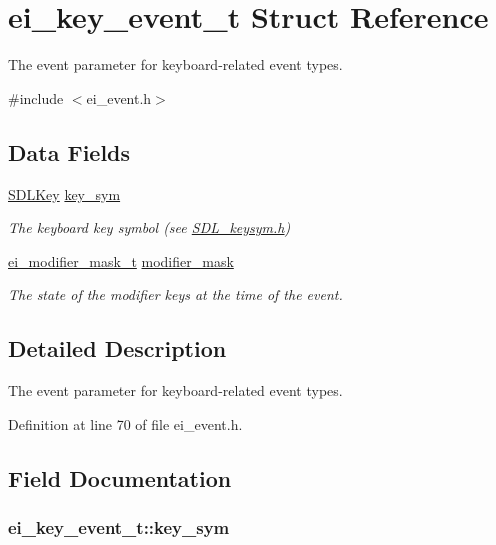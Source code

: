 \hypertarget{structei__key__event__t}{\section{ei\-\_\-key\-\_\-event\-\_\-t Struct Reference}
\label{structei__key__event__t}
}


The event parameter for keyboard-\/related event types.  




{\ttfamily \#include $<$ei\-\_\-event.\-h$>$}

\subsection*{Data Fields}
\begin{DoxyCompactItemize}
\item 
\hyperlink{_s_d_l__keysym_8h_ab8a13abddfa48bf4201973c2aa0afc1a}{S\-D\-L\-Key} \hyperlink{structei__key__event__t_a34be444e0f81bfa20e0b053779faf873}{key\-\_\-sym}
\begin{DoxyCompactList}\small\item\em The keyboard key symbol (see \hyperlink{_s_d_l__keysym_8h}{S\-D\-L\-\_\-keysym.\-h}) \end{DoxyCompactList}\item 
\hyperlink{ei__event_8h_abcdd2ef0f39179463f17a06be9bdf949}{ei\-\_\-modifier\-\_\-mask\-\_\-t} \hyperlink{structei__key__event__t_a35e4dc6d788b9fdd4eeedf716662afab}{modifier\-\_\-mask}
\begin{DoxyCompactList}\small\item\em The state of the modifier keys at the time of the event. \end{DoxyCompactList}\end{DoxyCompactItemize}


\subsection{Detailed Description}
The event parameter for keyboard-\/related event types. 

Definition at line 70 of file ei\-\_\-event.\-h.



\subsection{Field Documentation}
\hypertarget{structei__key__event__t_a34be444e0f81bfa20e0b053779faf873}{
\subsubsection[{key\-\_\-sym}]{ ei\-\_\-key\-\_\-event\-\_\-t\-::key\-\_\-sym}}\label{structei__key__event__t_a34be444e0f81bfa20e0b053779faf873}


